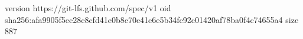 version https://git-lfs.github.com/spec/v1
oid sha256:afa9905f5ec28c8cfd41e0b8c70e41e6e5b34fc92c01420af78ba0f4c74655a4
size 887
